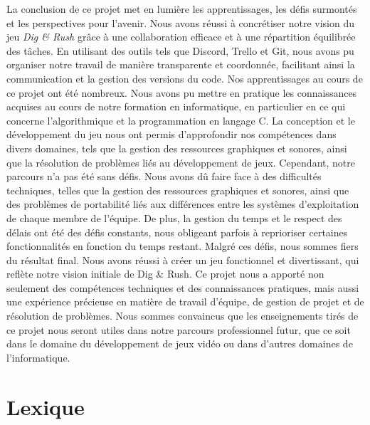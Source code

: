 \documentclass[a4paper,12pt]{article}
\begin{document}
La conclusion de ce projet met en lumière les apprentissages, les défis surmontés et les perspectives pour l'avenir. Nous avons réussi à concrétiser notre vision du jeu \textit{Dig \& Rush} grâce à une collaboration efficace et à une répartition équilibrée des tâches. En utilisant des outils tels que Discord, Trello et Git, nous avons pu organiser notre travail de manière transparente et coordonnée, facilitant ainsi la communication et la gestion des versions du code.
Nos apprentissages au cours de ce projet ont été nombreux. Nous avons pu mettre en pratique les connaissances acquises au cours de notre formation en informatique, en particulier en ce qui concerne l'algorithmique et la programmation en langage C. La conception et le développement du jeu nous ont permis d'approfondir nos compétences dans divers domaines, tels que la gestion des ressources graphiques et sonores, ainsi que la résolution de problèmes liés au développement de jeux.
Cependant, notre parcours n'a pas été sans défis. Nous avons dû faire face à des difficultés techniques, telles que la gestion des ressources graphiques et sonores, ainsi que des problèmes de portabilité liés aux différences entre les systèmes d'exploitation de chaque membre de l'équipe. De plus, la gestion du temps et le respect des délais ont été des défis constants, nous obligeant parfois à reprioriser certaines fonctionnalités en fonction du temps restant.
Malgré ces défis, nous sommes fiers du résultat final. Nous avons réussi à créer un jeu fonctionnel et divertissant, qui reflète notre vision initiale de Dig \& Rush. Ce projet nous a apporté non seulement des compétences techniques et des connaissances pratiques, mais aussi une expérience précieuse en matière de travail d'équipe, de gestion de projet et de résolution de problèmes. Nous sommes convaincus que les enseignements tirés de ce projet nous seront utiles dans notre parcours professionnel futur, que ce soit dans le domaine du développement de jeux vidéo ou dans d'autres domaines de l'informatique.

\newpage
\appendix

\section{Lexique}
\end{document}
